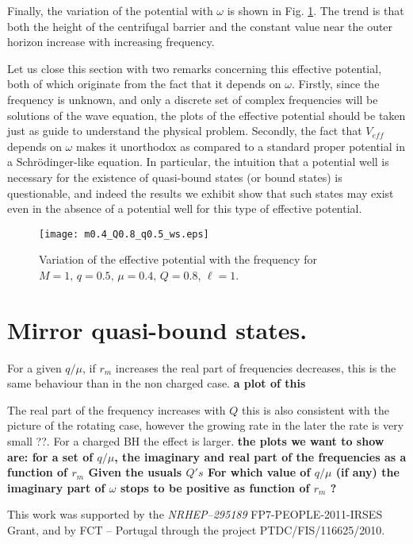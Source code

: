 \documentclass[aps, prd, twocolumn, amsmath, floats,floatfix, superscriptaddress,
nofootinbib, showpacs]{revtex4-1}
\begin{document}
Finally, the variation of the potential with $\omega$ is shown in Fig. \ref{fig:pot_w}. 
The trend is that both the height of the centrifugal barrier and the constant value near
the outer horizon increase with increasing frequency.


Let us close this section with two remarks concerning this effective potential, both of 
which originate from the fact that it depends on $\omega$. Firstly, since the frequency is
unknown, and only a discrete set of complex frequencies will be solutions of the wave
equation, the plots of the effective potential  should be taken just as guide to
understand the physical problem. Secondly, the fact that $V_{eff}$ depends on $\omega$
makes it unorthodox as compared to a standard proper potential in a Schr\"odinger-like
equation. In particular, the intuition that a potential well is necessary for the
existence of quasi-bound states (or bound states) is questionable, and indeed the results
we exhibit show that such states may exist even in the absence of a potential well for
this type of effective potential.


\begin{figure}[!ht]
\texttt{[image: m0.4\_Q0.8\_q0.5\_ws.eps]}
\caption{Variation of the effective potential with the frequency for $M=1,\,q=0.5,\,
\mu=0.4 ,\, Q=0.8$, $\ell=1$.}
\label{fig:pot_w}
\end{figure}

\section{Mirror quasi-bound states.}
\label{sec:Mbound-states}
For a given $q/\mu$, if $r_m$ increases the real part of frequencies decreases, this is
the same behaviour than in the non charged case.
{\bf a plot of this}

The real part of the frequency increases with $Q$ this is also consistent with the picture
of the rotating case, however the growing rate in the later the rate is very small ??. For
a charged BH the effect is larger. 
{\bf the plots we want to show are:
for a set of $q/\mu$, the imaginary and real part of the frequencies as a function of
$r_{m}$
Given the usuals $Q's$ 
For which value of $q/\mu$ (if any) the imaginary part of $\omega$ stops to be positive
as function of $r_{m}$ ?
}



  This work was supported by the {\it NRHEP--295189} FP7-PEOPLE-2011-IRSES Grant, and by
  FCT -- Portugal through the project PTDC/FIS/116625/2010.







\end{document}
